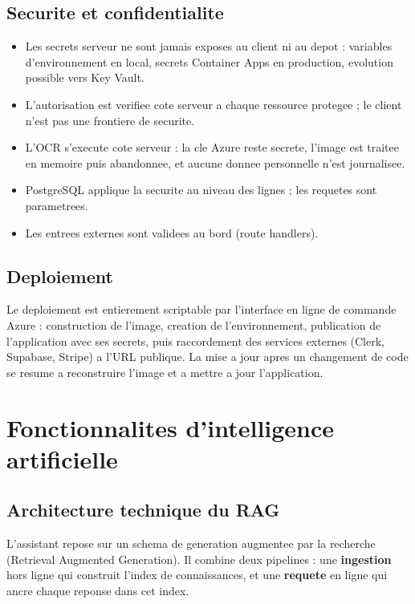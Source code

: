 \documentclass[11pt,a4paper]{article}
\begin{document}
\subsection{Securite et confidentialite}
\begin{itemize}[leftmargin=1.4em]
  \item Les secrets serveur ne sont jamais exposes au client ni au depot : variables d'environnement en local, secrets Container Apps en production, evolution possible vers Key Vault.
  \item L'autorisation est verifiee cote serveur a chaque ressource protegee ; le client n'est pas une frontiere de securite.
  \item L'OCR s'execute cote serveur : la cle Azure reste secrete, l'image est traitee en memoire puis abandonnee, et aucune donnee personnelle n'est journalisee.
  \item PostgreSQL applique la securite au niveau des lignes ; les requetes sont parametrees.
  \item Les entrees externes sont validees au bord (route handlers).
\end{itemize}

\subsection{Deploiement}
Le deploiement est entierement scriptable par l'interface en ligne de commande
Azure : construction de l'image, creation de l'environnement, publication de
l'application avec ses secrets, puis raccordement des services externes (Clerk,
Supabase, Stripe) a l'URL publique. La mise a jour apres un changement de code se
resume a reconstruire l'image et a mettre a jour l'application.

\section{Fonctionnalites d'intelligence artificielle}

\subsection{Architecture technique du RAG}
L'assistant repose sur un schema de generation augmentee par la recherche
(Retrieval Augmented Generation). Il combine deux pipelines : une \textbf{ingestion}
hors ligne qui construit l'index de connaissances, et une \textbf{requete} en
ligne qui ancre chaque reponse dans cet index.
\end{document}
